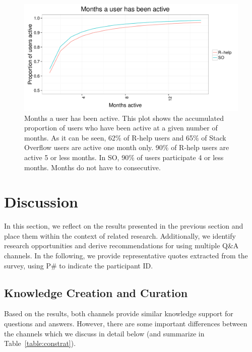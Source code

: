 \documentclass[smallextended]{svjour3}       %
\newcommand{\SO}{Stack Overflow\xspace}
\newcommand{\RH}{R-help\xspace}
\begin{document}
\begin{figure}[htbp]
  \centering
  \includegraphics[width=.95\textwidth]{figs/monthsPerUser.pdf}
  \caption{Months a user has been active. This plot shows the accumulated proportion of users who have been active at a
    given number of months. As it can be seen, 62\% of \RH users and 65\% of \SO users are active one month only.
    90\% of \RH users are active 5 or less months. In SO, 90\% of users participate 4 or less months. Months do not have
  to consecutive.}
  \label{fig:monthsPerUser}
\end{figure}



\section{Discussion}
\label{cha:theory}

In this section, we reflect on the results presented in the previous section and place them within the context of related research. Additionally, we identify research opportunities and derive recommendations for using multiple Q\&A channels.
In the following, we provide representative quotes extracted from the survey, using P\# to indicate the participant ID.

\subsection{Knowledge Creation and Curation}

    Based on the results, both channels provide similar knowledge support for questions and answers.
    However, there are some important differences between the channels which we discuss in detail below (and summarize in Table~\ref{table:constrat}).
\end{document}
